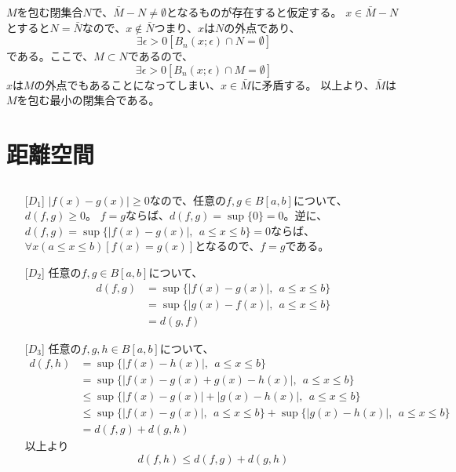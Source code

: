\documentclass{jsarticle}
\begin{document}
\subsubsection{}
$M$を包む閉集合$N$で、$\bar{M}-N\neq \emptyset$となるものが存在すると仮定する。
$x\in \bar{M}-N$とすると$N=\bar{N}$なので、$x\notin\bar{N}$つまり、$x$は$N$の外点であり、
\[\exists\epsilon>0[B_n(x;\epsilon)\cap N=\emptyset]\]
である。ここで、$M\subset N$であるので、
\[\exists\epsilon>0[B_n(x;\epsilon)\cap M=\emptyset]\]
$x$は$M$の外点でもあることになってしまい、$x\in \bar{M}$に矛盾する。
以上より、$\bar{M}$は$M$を包む最小の閉集合である。








\section{距離空間}

\subsection{}
\begin{enumerate}
\item[{[$D_1$]}] 
$|f(x)-g(x)|\geq 0$なので、任意の$f,g\in B[a,b]$について、$d(f,g)\geq 0$。
$f=g$ならば、$d(f,g)=\sup\{0\}=0$。逆に、$d(f,g)=\sup\{|f(x)-g(x)|,\ \ a\leq x\leq b\}=0$ならば、$\forall x (a\leq x\leq b)[f(x)=g(x)]$となるので、$f=g$である。

\item[{[$D_2$]}]
任意の$f,g\in B[a,b]$について、
\begin{align*}
d(f,g)&=\sup\{|f(x)-g(x)|,\ \ a\leq x\leq b\}\\
 &=\sup\{|g(x)-f(x)|,\ \ a\leq x\leq b\}\\
 &=d(g,f)
\end{align*}
\item[{[$D_3$]}]
任意の$f,g,h\in B[a,b]$について、
\begin{align*}
d(f,h)&=\sup\{|f(x)-h(x)|,\ \ a\leq x\leq b\}\\
 &=\sup\{|f(x)-g(x)+g(x)-h(x)|,\ \ a\leq x\leq b\}\\
 &\leq\sup\{|f(x)-g(x)|+|g(x)-h(x)|,\ \ a\leq x\leq b\}\\
 &\leq\sup\{|f(x)-g(x)|,\ \ a\leq x\leq b\}+\sup\{|g(x)-h(x)|,\ \ a\leq x\leq b\}\\
 &=d(f,g)+d(g,h)
\end{align*}
以上より\[d(f,h)\leq d(f,g)+d(g,h)\]

\end{enumerate}
\end{document}
